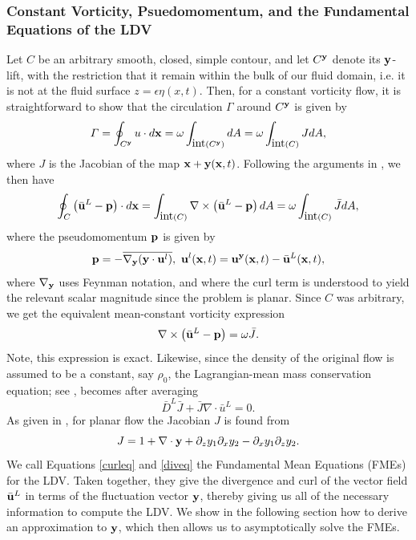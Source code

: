 \documentclass{JFM_Style/jfm}
\begin{document}
\subsubsection*{Constant Vorticity, Psuedomomentum, and the Fundamental Equations of the LDV}
Let $C$ be an arbitrary smooth, closed, simple contour, and let $C^{{\bf y}}$ denote its ${\bf y}$-lift, with the restriction that it remain within the bulk of our fluid domain, i.e. it is not at the fluid surface $z=\epsilon \eta(x,t)$.  Then, for a constant vorticity flow, it is straightforward to show that the circulation $\Gamma$ around $C^{{\bf y}}$ is given by
\[
\Gamma = \oint_{C^{{\bf y}}} u\cdot d{\bf x} = \omega \int_{\mbox{int}(C^{{\bf y}})}dA = \omega \int_{ \mbox{int}(C)} J dA, 
\]
where $J$ is the Jacobian of the map ${\bf x} + {\bf y}({\bf x},t)$.   Following the arguments in \cite{buhler}, we then have 
\[
\oint_{C} \left(\bar{{\bf u}}^{L} - {\bf p} \right)\cdot d{\bf x} = \int_{\mbox{int}(C)} \nabla \times \left(\bar{{\bf u}}^{L} - {\bf p} \right)dA = \omega \int_{ \mbox{int}(C)} \bar{J} dA,
\]
where the pseudomomentum ${\bf p}$ is given by 
\[
{\bf p} = -\overline{\nabla_{{\bf y}}({\bf y}\cdot {\bf u}^{l})}, ~{\bf u}^{l}({\bf x},t) = {\bf u}^{\bf y}({\bf x},t) - \bar{{\bf u}}^{L}({\bf x},t),
\]
where $\nabla_{{\bf y}}$ uses Feynman notation, and where the curl term is understood to yield the relevant scalar magnitude since the problem is planar.  Since $C$ was arbitrary, we get the equivalent mean-constant vorticity expression
\begin{equation}
\nabla \times \left(\bar{{\bf u}}^{L} - {\bf p} \right) = \omega \bar{J}.
\label{curleq}
\end{equation}
Note, this expression is exact.  Likewise, since the density of the original flow is assumed to be a constant, say $\rho_{0}$, the Lagrangian-mean mass conservation equation; see \cite{andrews,buhler}, becomes after averaging
\begin{equation}
\bar{D}^{L}\bar{J} + \bar{J}\nabla\cdot{\bar u}^{L} = 0.
\label{diveq}
\end{equation}
As given in \cite{buhler}, for planar flow the Jacobian $J$ is found from 
\[
J = 1 + \nabla \cdot {\bf y} + \p_{z}y_{1}\p_{x}y_{2} - \p_{x}y_{1}\p_{z}y_{2}.
\]
We call Equations \eqref{curleq} and \eqref{diveq} the Fundamental Mean Equations (FMEs) for the LDV.  Taken together, they give the divergence and curl of the vector field $\bar{{\bf u}}^{L}$ in terms of the fluctuation vector ${\bf y}$, thereby giving us all of the necessary information to compute the LDV.  We show in the following section how to derive an approximation to ${\bf y}$, which then allows us to asymptotically solve the FMEs.  
\end{document}

